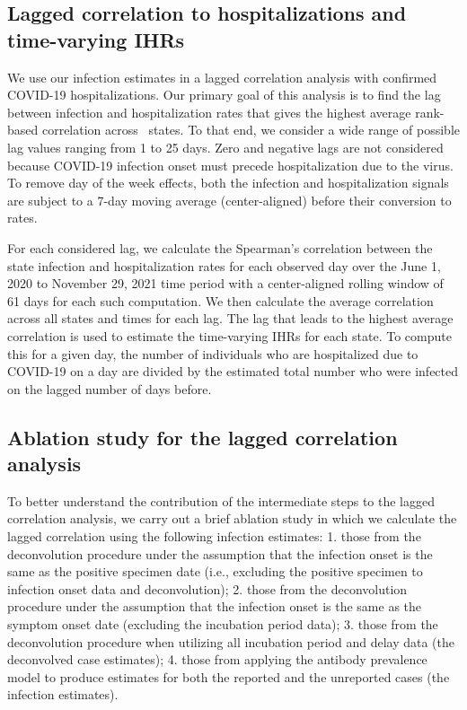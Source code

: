 \documentclass{article}
\begin{document}
\subsection{Lagged correlation to hospitalizations and time-varying IHRs} 

We use our infection estimates in a lagged correlation analysis with
confirmed COVID-19 hospitalizations. Our primary goal of this analysis is to
find the lag between infection and hospitalization rates that gives the highest
average rank-based correlation across \US\ states. To that end, we consider a wide
range of possible lag values ranging from 1 to 25 days. Zero and negative
lags are not considered because COVID-19 infection onset must precede
hospitalization due to the virus. To remove day of the week effects, both the
infection and hospitalization signals are subject to a 7-day moving
average (center-aligned) before their conversion to rates.

For each considered lag, we calculate the Spearman's correlation between the 
state infection and hospitalization rates for each observed day 
over the June 1, 2020 to November 29, 2021
time period %
with a center-aligned rolling window of 61 days for each such computation.
We then calculate the average correlation across all states and times for each lag. 
The lag that leads to the highest average correlation is used to estimate 
the time-varying IHRs for each
state. To compute this for a given day, the number of individuals who are
hospitalized due to COVID-19 on a day are divided by the estimated total number
who were infected on the lagged number of days before.

\subsection{Ablation study for the lagged correlation analysis} 

To better understand the contribution of the intermediate steps to the lagged 
correlation analysis, we carry out a brief ablation study in which we calculate the 
lagged correlation using the following infection estimates: 1. those from the
deconvolution procedure under the assumption that the infection onset is the
same as the positive specimen date (i.e., excluding the positive specimen to infection onset data and deconvolution); 
2. those from the deconvolution procedure under the assumption that the infection onset is the
same as the symptom onset date (excluding the incubation period data); 
3. those from the deconvolution procedure when utilizing all incubation period and delay data 
(the deconvolved case estimates); 4. those from applying the antibody prevalence 
model to produce estimates for both the reported and the unreported 
cases (the infection estimates).
\end{document}
